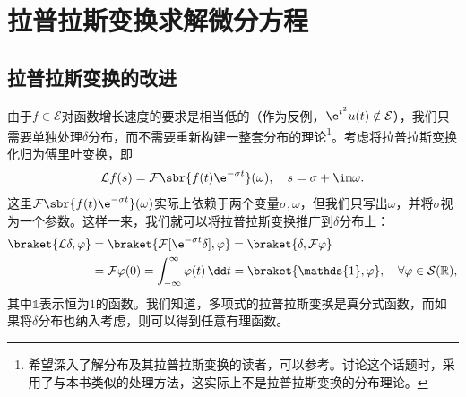 \section{拉普拉斯变换求解微分方程}\label{sec:Laplace_ODE}

\subsection{拉普拉斯变换的改进}\label{sub:improvement_of_laplace}

由于$f\in\mathcal{E}$对函数增长速度的要求是相当低的（作为反例，$\e^{t^2}u(t)\notin\mathcal{E}$），我们只需要单独处理$\delta$分布，而不需要重新构建一整套分布的理论\footnote{希望深入了解分布及其拉普拉斯变换的读者，可以参考\cite{Laplace_Distribution}。\cite{distribution}讨论这个话题时，采用了与本书类似的处理方法，这实际上不是拉普拉斯变换的分布理论。}。考虑将拉普拉斯变换化归为傅里叶变换，即
\begin{equation}
    \mathcal{L}f(s)=\mathcal{F}\sbr{f(t)\e^{-\sigma t}}(\omega),\quad s=\sigma+\im\omega.
\end{equation}
这里$\mathcal{F}\sbr{f(t)\e^{-\sigma t}}(\omega)$实际上依赖于两个变量$\sigma,\omega$，但我们只写出$\omega$，并将$\sigma$视为一个参数\cite{distribution}。这样一来，我们就可以将拉普拉斯变换推广到$\delta$分布上：
\begin{align}
    \braket{\mathcal{L}\delta,\varphi}&=\braket{\mathcal{F}[\e^{-\sigma t}\delta],\varphi}=\braket{\delta,\mathcal{F}\varphi}\nonumber\\
    &=\mathcal{F}\varphi(0)=\int_{-\infty}^{\infty}\varphi(t)\,\dd t=\braket{\mathds{1},\varphi},\quad \forall\varphi\in\mathcal{S}(\mathbb{R}),
\end{align}
其中$\mathds{1}$表示恒为$1$的函数。我们知道，多项式的拉普拉斯变换是真分式函数，而如果将$\delta$分布也纳入考虑，则可以得到任意有理函数。

